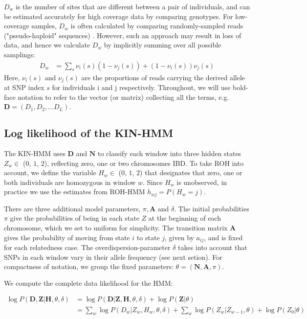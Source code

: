 \documentclass[12pt, letterpaper]{article}
\newcommand{\BZ}{\mathbf{Z}}
\newcommand{\BD}{\mathbf{D}}
\newcommand{\BN}{\mathbf{N}}
\newcommand{\BH}{\mathbf{H}}
\begin{document}
$D_w$ is the number of sites that are different between a pair of individuals, and can be estimated accurately for high coverage data by comparing genotypes. For low-coverage samples, $D_w$ is often calculated by comparing randomly-sampled reads ("pseudo-haploid" sequences) \cite{haak_massive_2015}. However, such an approach may result in loss of data, and hence we calculate $D_w$ by implicitly summing over all possible samplings:
\begin{align}\label{eq:x}
D_w &= \sum_s \nu_i(s) (1-\nu_j(s)) + (1-\nu_i(s)) \nu_j(s)
\end{align}
Here, $\nu_i(s)$ and $\nu_j(s)$ are the proportions of reads carrying the derived allele at SNP index $s$ for individuals i and j respectively.
Throughout, we will use bold-face notation to refer to the vector (or matrix) collecting  all the terms, e.g. $\BD = (D_1, D_2, \dots D_L)$. 


\subsection{Log likelihood of the KIN-HMM}\label{ll}
The KIN-HMM uses $\BD$ and $\BN$ to classify each window into three hidden states $Z_w \in$ ($0$, $1$, $2$), reflecting zero, one or two chromosomes IBD. To take ROH into account, we define the variable $H_w \in$ ($0$, $1$, $2$) that designates that zero, one or both individuals are homozygous in window $w$. Since $H_w$ is unobserved, in practice we use the estimates from ROH-HMM $h_{wj} = P(H_w = j)$. 

There are three additional model parameters, $\pi, \mathbf{A}$ and $\delta$. The initial probabilities $\pi$ give the probabilities of being in each state $Z$ at the beginning of each chromosome, which we set to uniform for simplicity. The transition matrix $\mathbf{A}$ gives the probability of moving from state $i$ to state $j$, given by $a_{ij}$, and is fixed for each relatedness case. The overdispersion-parameter $\delta$ takes into account that SNPs in each window vary in their allele frequency (see next setion).  For compactness of notation, we group the fixed parameters: $\theta = (\BN, \mathbf{A}, \pi)$. 

We compute the complete data likelihood for the HMM:

\begin{align}\label{eq:1}
\log P(\BD,\BZ|\BH, \theta, \delta) &= \log P(\BD|\BZ,\BH, \theta, \delta) + \log P(\BZ |\theta) \nonumber\\
&= \sum_w \log P(D_w|Z_w,H_w, \theta, \delta) + \sum_w \log P(Z_w |Z_{w-1},\theta) + \log P(Z_0|\theta)
\end{align}
\end{document}
